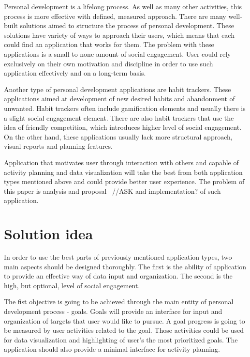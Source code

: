 Personal development is a lifelong process.
As well as many other activities, this process is more effective with defined, measured approach.
There are many well-built solutions aimed to structure the process of personal development.
These solutions have variety of ways to approach their users, which means that each could find an application that works for them.
The problem with these applications is a small to none amount of social engagement.
User could rely exclusively on their own motivation and discipline in order to use such application effectively and on a long-term basis.

Another type of personal development applications are habit trackers.
These applications aimed at development of new desired habits and abandonment of unwanted.
Habit trackers often include gamification elements and usually there is a slight social engagement element.
There are also habit trackers that use the idea of friendly competition, which introduces higher level of social engagement.
On the other hand, these applications usually lack more structural approach, visual reports and planning features.

Application that motivates user through interaction with others and capable of activity planning and data visualization
will take the best from both application types mentioned above and could provide better user experience.
The problem of this paper is analysis and proposal ~{\color{gray}//ASK and implementation?} of such application.


\section{Solution idea}\label{sec:solution-idea}

In order to use the best parts of previously mentioned application types, two main aspects should be designed thoroughly.
The first is the ability of application to provide an effective way of data input and organization.
The second is the high, but optional, level of social engagement.

The fist objective is going to be achieved through the main entity of personal development process - goals.
Goals will provide an interface for input and organization of targets that user would like to pursue.
A goal progress is going to be measured by user activities related to the goal.
Those activities could be used for data visualization and highlighting of user's the most prioritized goals.
The application should also provide a minimal interface for activity planning.

